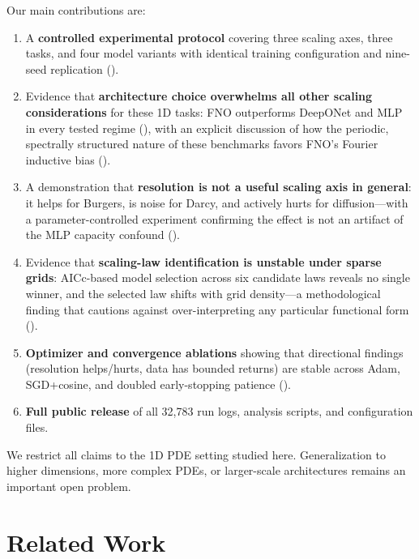 \documentclass[11pt]{article}
\begin{document}
Our main contributions are:
\begin{enumerate}[leftmargin=*,itemsep=2pt]
  \item A \textbf{controlled experimental protocol} covering three
    scaling axes, three tasks, and four model variants with identical
    training configuration and nine-seed replication
    ().

  \item Evidence that \textbf{architecture choice overwhelms all other
    scaling considerations} for these 1D tasks: FNO outperforms
    DeepONet and MLP in every tested regime (),
    with an explicit discussion of how the periodic, spectrally
    structured nature of these benchmarks favors FNO's Fourier
    inductive bias ().

  \item A demonstration that \textbf{resolution is not a useful scaling
    axis in general}: it helps for Burgers, is noise for Darcy, and
    actively hurts for diffusion---with a parameter-controlled
    experiment confirming the effect is not an artifact of the
    MLP capacity confound ().

  \item Evidence that \textbf{scaling-law identification is unstable
    under sparse grids}: AICc-based model selection across six
    candidate laws reveals no single winner, and the selected law
    shifts with grid density---a methodological finding that cautions
    against over-interpreting any particular functional form
    ().

  \item \textbf{Optimizer and convergence ablations} showing that
    directional findings (resolution helps/hurts, data has bounded
    returns) are stable across Adam, SGD+cosine, and doubled
    early-stopping patience ().

  \item \textbf{Full public release} of all 32{,}783 run logs,
    analysis scripts, and configuration files.
\end{enumerate}

We restrict all claims to the 1D PDE setting studied here.
Generalization to higher dimensions, more complex PDEs, or
larger-scale architectures remains an important open problem.


\section{Related Work}
\label{sec:related}
\end{document}

